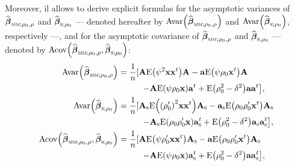 Moreover, il allows to derive explicit formulas for the asymptotic variances
of $\sthat{\boldsymbol\beta}_{\stsc{MM};\rho_{0},\rho}$ and
$\sthat{\boldsymbol\beta}_{\stsc{S};\rho_{0}}$ --- denoted hereafter by
$\mathrm{Avar}\left(  \sthat{\boldsymbol\beta}_{\stsc{MM};\rho_{0},\rho
}\right)  $ and $\mathrm{Avar}\left(  \sthat{\boldsymbol\beta}%
_{\stsc{S};\rho_{0}}\right)  $, respectively ---, and for the asymptotic
covariance of $\sthat{\boldsymbol\beta}_{\stsc{MM};\rho_{0},\rho}$ and
$\sthat{\boldsymbol\beta}_{\stsc{S};\rho_{0}}$ --- denoted by
$\mathrm{Acov}\left(  \sthat{\boldsymbol\beta}_{\stsc{MM};\rho_{0},\rho
},\sthat{\boldsymbol\beta}_{\stsc{S};\rho_{0}}\right)  $:%
\begin{align}
\mathrm{Avar}\left(  \sthat{\boldsymbol\beta}_{\stsc{MM};\rho_{0},\rho
}\right)   &  =\frac{1}{n}[\mathbf{A}\mathrm{E}\left(  \psi^{2}\mathbf{xx}%
^{t}\right)  \mathbf{A}-\mathbf{a}\mathrm{E}\left(  \psi\rho_{0}\stvec{x}%
^{t}\right)  \mathbf{A}\label{eq:Avar_betahat_MM}\\
&  \hspace*{1cm}\left.  -\mathbf{A}\mathrm{E}\left(  \psi\rho_{0}%
\stvec{x}\right)  \mathbf{a}^{t}+\mathrm{E}\left(  \rho_{0}^{2}-\delta
^{2}\right)  \mathbf{aa}^{t}\right]  ,\nonumber\\
\mathrm{Avar}\left(  \sthat{\boldsymbol\beta}_{\stsc{S};\rho_{0}%
}\right)   &  =\frac{1}{n}[\mathbf{A}_{\stsc{S}}\mathrm{E}\left(  \left(
\rho_{0}^{\prime}\right)  ^{2}\mathbf{xx}^{t}\right)  \mathbf{A}_{\stsc{S}%
}-\mathbf{a}_{\stsc{S}}\mathrm{E}\left(  \rho_{0}\rho_{0}^{\prime}%
\stvec{x}^{t}\right)  \mathbf{A}_{\stsc{S}}\label{eq:Avar_betahat_S}\\
&  \hspace*{1cm}\left.  -\mathbf{A}_{\stsc{S}}\mathrm{E}\left(  \rho_{0}%
\rho_{0}^{\prime}\stvec{x}\right)  \mathbf{a}_{\stsc{S}}^{t}+\mathrm{E}%
\left(  \rho_{0}^{2}-\delta^{2}\right)  \mathbf{a}_{\stsc{S}}\mathbf{a}%
_{\stsc{S}}^{t}\right]  ,\nonumber\\
\mathrm{Acov}\left(  \sthat{\boldsymbol\beta}_{\stsc{MM};\rho_{0},\rho
},\sthat{\boldsymbol\beta}_{\stsc{S};\rho_{0}}\right)   &  =\frac{1}%
{n}[\mathbf{A}\mathrm{E}\left(  \psi\rho_{0}^{\prime}\mathbf{xx}^{t}\right)
\mathbf{A}_{\stsc{S}}-\mathbf{a}\mathrm{E}\left(  \rho_{0}\rho_{0}^{\prime
}\stvec{x}^{t}\right)  \mathbf{A}_{\stsc{S}}\label{eq:Acov_betahat_MM_S}\\
&  \hspace*{1cm}\left.  -\mathbf{A}\mathrm{E}\left(  \psi\rho_{0}%
\stvec{x}\right)  \mathbf{a}_{\stsc{S}}^{t}+\mathrm{E}\left(  \rho_{0}%
^{2}-\delta^{2}\right)  \mathbf{aa}_{\stsc{S}}^{t}\right]  ,\nonumber
\end{align}
